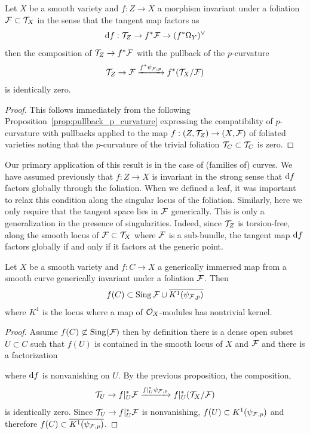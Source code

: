 \documentclass[main.tex]{subfiles}
\begin{document}
\begin{prop}
Let $X$ be a smooth variety and $f : Z \to X$ a morphism invariant under a foliation $\mathcal{F} \subset \mathcal{T}_X$ in the sense that the tangent map factors as
\[ \mathrm{d}{f} : \mathcal{T}_Z \to f^* \mathcal{F} \to (f^* \Omega_Y)^{\vee} \]
then the composition of $\mathcal{T}_Z \to f^* \mathcal{F}$ with the pullback of the $p$-curvature
\[ \mathcal{T}_Z \to \mathcal{F} \xrightarrow{f^* \psi_{\mathcal{F},p}} f^* (\mathcal{T}_X / \mathcal{F})  \]
is identically zero.   
\end{prop}

\begin{proof}
This follows immediately from the following Proposition~\ref{prop:pullback_p_curvature} expressing the compatibility of $p$-curvature with pullbacks applied to the map $f : (Z, \mathcal{T}_Z) \to (X, \mathcal{F})$ of foliated varieties noting that the $p$-curvature of the trivial foliation $\mathcal{T}_C \subset \mathcal{T}_C$ is zero. 
\end{proof}

Our primary application of this result is in the case of (families of) curves. We have assumed previously that $f : Z \to X$ is invariant in the strong sense that $\mathrm{d}{f}$ factors globally through the foliation. When we defined a leaf, it was important to relax this condition along the singular locus of the foliation. Similarly, here we only require that the tangent space lies in $\mathcal{F}$ generically. This is only a generalization in the presence of singularities. Indeed, since $\mathcal{T}_Z$ is torsion-free, along the smooth locus of $\mathcal{F} \subset \mathcal{T}_X$ where $\mathcal{F}$ is a sub-bundle, the tangent map $\mathrm{d}{f}$ factors globally if and only if it factors at the generic point. 

\begin{cor}
Let $X$ be a smooth variety and $f : C \to X$ a generically immersed map from a smooth curve generically invariant under a foliation $\mathcal{F}$. Then
\[ f(C) \subset \operatorname{\mathrm{Sing}}{\mathcal{F}} \cup \overline{K^1(\psi_{\mathcal{F},p})} \]
where $K^1$ is the locus where a map of $\mathcal{O}_X$-modules has nontrivial kernel.
\end{cor}

\begin{proof}
Assume $f(C) \not\subset \operatorname{\mathrm{Sing}}(\mathcal{F})$ then by definition there is a dense open subset $U \subset C$ such that $f(U)$ is contained in the smooth locus of $X$ and $\mathcal{F}$ and there is a factorization
\begin{center}
\end{center}
where $\mathrm{d}{f}$ is nonvanishing on $U$. By the previous proposition, the composition,
\[ \mathcal{T}_U \to f|_{U}^* \mathcal{F} \xrightarrow{f|_U^* \psi_{\mathcal{F},p}} f|_{U}^* (\mathcal{T}_X / \mathcal{F}) \]
is identically zero. Since $\mathcal{T}_U  \to f|_{U}^* \mathcal{F}$ is nonvanishing, $f(U) \subset K^1(\psi_{\mathcal{F},p})$ and therefore $f(C) \subset \overline{K^1(\psi_{\mathcal{F},p})}$. 
\end{proof}
\end{document}
